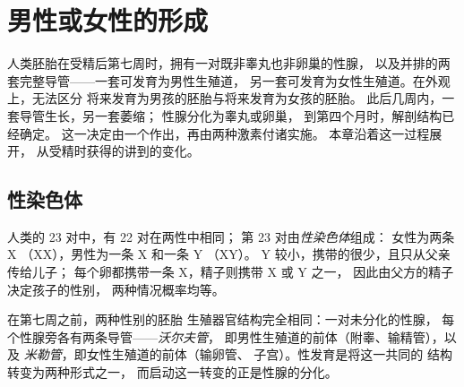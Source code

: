 \chapter{男性或女性的形成}\label{ch:g11:becoming-male-female}

人类胚胎在受精后第七周时，拥有一对既非睾丸也非卵巢的性腺，
以及并排的两套完整导管——一套可发育为男性生殖道，
另一套可发育为女性生殖道。在外观上，无法区分
将来发育为男孩的胚胎与将来发育为女孩的胚胎。
此后几周内，一套导管生长，另一套萎缩；
性腺分化为睾丸或卵巢，
到第四个月时，解剖结构已经确定。
这一决定由一个作出，再由两种激素付诸实施。
本章沿着这一过程展开，
从受精时获得的讲到的变化。

\section{性染色体}

\begin{definition}[性染色体]\label{def:g11:becoming-male-female:chromosomes}
人类的 23 对中，有 22 对在两性中相同；
第 23 对由\emph{性染色体}组成：
女性为两条 X （XX），男性为一条 X 和一条 Y （XY）。
Y 较小，携带的很少，且只从父亲传给儿子；
每个卵都携带一条 X，精子则携带 X 或 Y 之一，
因此由父方的精子决定孩子的性别，
两种情况概率均等。
\end{definition}

\begin{proposition}[未分化阶段]\label{prop:g11:becoming-male-female:undifferentiated}
在第七周之前，两种性别的胚胎
生殖器官结构完全相同：一对未分化的性腺，
每个性腺旁各有两条导管——\emph{沃尔夫管}，
即男性生殖道的前体（附睾、输精管），以及
\emph{米勒管}，即女性生殖道的前体（输卵管、
子宫）。性发育是将这一共同的
结构转变为两种形式之一，
而启动这一转变的正是性腺的分化。
\end{proposition}
\admitted

